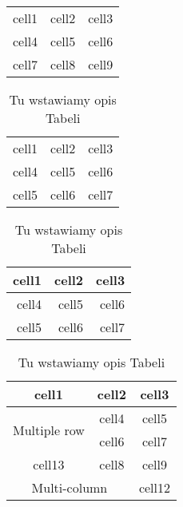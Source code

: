\documentclass[12pt,a4paper]{article}
\begin{document}
\begin{center}

\begin{table}
\begin{tabular}{ r r r }
cell1 & cell2 & cell3 \\
cell4 & cell5 & cell6 \\
cell7 & cell8 & cell9
\end{tabular}
\end{table}
\begin{table}[h]
\centering\caption{Tu wstawiamy opis Tabeli}
\begin{tabular}{c c c}
cell1 & cell2 & cell3\\
cell4 & cell5 & cell6\\
cell5 & cell6 & cell7
\end{tabular}
\end{table}

\end{center}

\begin{table}[h]
\centering\caption{Tu wstawiamy opis Tabeli}
\begin{tabular}{|r|r|r|}
\hline
cell1 & cell2 & cell3\\
\hline
cell4 & cell5 & cell6\\
\hline
cell5 & cell6 & cell7\\
\hline
\end{tabular}	
\end{table}

\begin{table}[h]
\centering\caption{Tu wstawiamy opis Tabeli}
\begin{tabular}{|c|c|c|}
\hline
cell1 & cell2 & cell3\\
\hline
\multirow{2}{4em}{Multiple row} & cell4 & cell5\\
& cell6 & cell7 \\
\hline
cell13 & cell8 & cell9 \\
\hline
\multicolumn{2}{|c|}{Multi-column} & cell12\\
\hline
\end{tabular}
\end{table}
\end{document}
